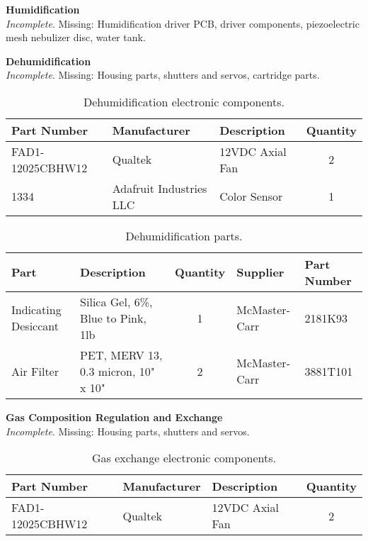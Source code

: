 \clearpage

\textbf{Humidification}\\
\textit{Incomplete}. Missing: Humidification driver PCB, driver components, piezoelectric mesh nebulizer disc, water tank.

\textbf{Dehumidification}\\
\textit{Incomplete}. Missing: Housing parts, shutters and servos, cartridge parts.
\begin{table}[!ht]
    \centering
    \begin{tabular}{|l|l|l|c|}
    \hline
        Part Number         & Manufacturer              & Description       & Quantity  \\ \hline
        FAD1-12025CBHW12    & Qualtek                   & 12VDC Axial Fan   & 2         \\ \hline
        1334                & Adafruit Industries LLC   & Color Sensor      & 1         \\ \hline
    \end{tabular}
    \caption{Dehumidification electronic components.}
    \label{tab:dehumidification_components}
\end{table}

\begin{table}[!ht]
    \centering
    \begin{tabular}{|l|l|c|l|l|}
    \hline
        Part                    & Description                           & Quantity  & Supplier      & Part Number   \\ \hline
        Indicating Desiccant    & Silica Gel, 6\%, Blue to Pink, 1lb    & 1         & McMaster-Carr & 2181K93       \\ \hline
        Air Filter              & PET, MERV 13, 0.3 micron, 10" x 10"   & 2         & McMaster-Carr & 3881T101      \\ \hline
    \end{tabular}
    \caption{Dehumidification parts.}
    \label{tab:dehumidification_parts}
\end{table}

\textbf{Gas Composition Regulation and Exchange}\\
\textit{Incomplete}. Missing: Housing parts, shutters and servos.
\begin{table}[!ht]
    \centering
    \begin{tabular}{|l|l|l|c|}
    \hline
        Part Number         & Manufacturer              & Description                       & Quantity  \\ \hline
        FAD1-12025CBHW12    & Qualtek                   & 12VDC Axial Fan                   & 2         \\ \hline
    \end{tabular}
    \caption{Gas exchange electronic components.}
    \label{tab:gas_components}
\end{table}

